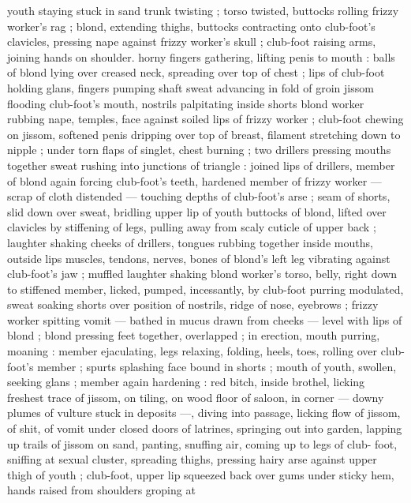 youth staying stuck in sand {\col} trunk twisting ; torso twisted, buttocks 
rolling frizzy worker's rag ; blond, extending thighs, buttocks 
contracting onto club-foot's clavicles, pressing nape against frizzy 
worker's skull ; club-foot raising arms, joining hands on shoulder. 
horny fingers gathering, lifting penis to mouth : balls of blond lying 
over creased neck, spreading over top of chest ; lips of club-foot 
holding glans, fingers pumping shaft {\col} sweat advancing in fold of 
groin {\col} jissom flooding club-foot's mouth, nostrils palpitating inside 
shorts {\col} blond worker rubbing nape, temples, face against soiled lips 
of frizzy worker ; club-foot chewing on jissom, softened penis 
dripping over top of breast, filament stretching down to nipple ; 
under torn flaps of singlet, chest burning ; two drillers pressing 
mouths together {\col} sweat rushing into junctions of triangle : joined 
lips of drillers, member of blond again forcing club-foot's teeth, 
hardened member of frizzy worker --- scrap of cloth distended --- 
touching depths of club-foot's arse ; seam of shorts, slid down over 
sweat, bridling upper lip of youth {\col} buttocks of blond, lifted over 
clavicles by stiffening of legs, pulling away from scaly cuticle of 
upper back ; laughter shaking cheeks of drillers, tongues rubbing 
together inside mouths, outside lips {\col} muscles, tendons, nerves, 
bones of blond's left leg vibrating against club-foot's jaw ; muffled 
laughter shaking blond worker's torso, belly, right down to stiffened 
member, licked, pumped, incessantly, by club-foot purring 
modulated, sweat soaking shorts over position of nostrils, ridge of 
nose, eyebrows ; frizzy worker spitting vomit --- bathed in mucus 
drawn from cheeks --- level with lips of blond ; blond pressing feet 
together, overlapped ; in erection, mouth purring, moaning : member 
ejaculating, legs relaxing, folding, heels, toes, rolling over club-foot's 
member ; spurts splashing face bound in shorts ; mouth of youth, 
swollen, seeking glans ; member again hardening : red bitch, inside 
brothel, licking freshest trace of jissom, on tiling, on wood floor of 
saloon, in corner --- downy plumes of vulture stuck in deposits ---, 
diving into passage, licking flow of jissom, of shit, of vomit under 
closed doors of latrines, springing out into garden, lapping up trails 
of jissom on sand, panting, snuffing air, coming up to legs of club- 
foot, sniffing at sexual cluster, spreading thighs, pressing hairy arse 
against upper thigh of youth ; club-foot, upper lip squeezed back 
over gums under sticky hem, hands raised from shoulders groping at 
